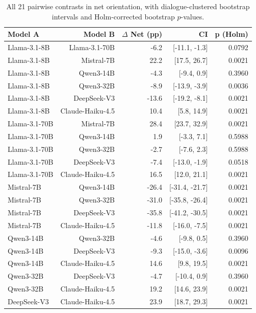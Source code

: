 \begin{table}[t]
\centering
\small
\caption{All 21 pairwise contrasts in net orientation, with dialogue-clustered bootstrap intervals and Holm-corrected bootstrap $p$-values.}
\label{tab:model_contrasts}
\begin{tabular}{lrrrr}
\toprule
Model A & Model B & $\Delta$ Net (pp) & CI & p (Holm) \\
\midrule
Llama-3.1-8B & Llama-3.1-70B & -6.2 & [-11.1, -1.3] & 0.0792 \\
Llama-3.1-8B & Mistral-7B & 22.2 & [17.5, 26.7] & 0.0021 \\
Llama-3.1-8B & Qwen3-14B & -4.3 & [-9.4, 0.9] & 0.3960 \\
Llama-3.1-8B & Qwen3-32B & -8.9 & [-13.9, -3.9] & 0.0036 \\
Llama-3.1-8B & DeepSeek-V3 & -13.6 & [-19.2, -8.1] & 0.0021 \\
Llama-3.1-8B & Claude-Haiku-4.5 & 10.4 & [5.8, 14.9] & 0.0021 \\
Llama-3.1-70B & Mistral-7B & 28.4 & [23.7, 32.9] & 0.0021 \\
Llama-3.1-70B & Qwen3-14B & 1.9 & [-3.3, 7.1] & 0.5988 \\
Llama-3.1-70B & Qwen3-32B & -2.7 & [-7.6, 2.3] & 0.5988 \\
Llama-3.1-70B & DeepSeek-V3 & -7.4 & [-13.0, -1.9] & 0.0518 \\
Llama-3.1-70B & Claude-Haiku-4.5 & 16.5 & [12.0, 21.1] & 0.0021 \\
Mistral-7B & Qwen3-14B & -26.4 & [-31.4, -21.7] & 0.0021 \\
Mistral-7B & Qwen3-32B & -31.0 & [-35.8, -26.4] & 0.0021 \\
Mistral-7B & DeepSeek-V3 & -35.8 & [-41.2, -30.5] & 0.0021 \\
Mistral-7B & Claude-Haiku-4.5 & -11.8 & [-16.0, -7.5] & 0.0021 \\
Qwen3-14B & Qwen3-32B & -4.6 & [-9.8, 0.5] & 0.3960 \\
Qwen3-14B & DeepSeek-V3 & -9.3 & [-15.0, -3.6] & 0.0096 \\
Qwen3-14B & Claude-Haiku-4.5 & 14.6 & [9.8, 19.5] & 0.0021 \\
Qwen3-32B & DeepSeek-V3 & -4.7 & [-10.4, 0.9] & 0.3960 \\
Qwen3-32B & Claude-Haiku-4.5 & 19.2 & [14.6, 23.9] & 0.0021 \\
DeepSeek-V3 & Claude-Haiku-4.5 & 23.9 & [18.7, 29.3] & 0.0021 \\
\bottomrule
\end{tabular}
\end{table}
